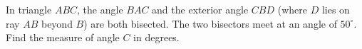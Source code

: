 In triangle $ABC$, the angle $BAC$ and the exterior angle $CBD$ (where $D$ lies on ray $AB$ beyond $B$) are both bisected. The two bisectors meet at an angle of $50^\circ$. Find the measure of angle $C$ in degrees.
